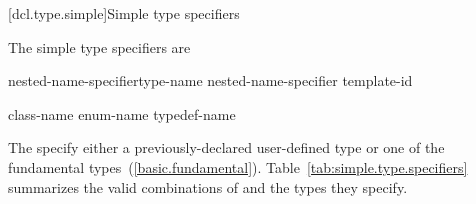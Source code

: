 [dcl.type.simple]{Simple type specifiers}%

\pnum
The simple type specifiers are

\begin{bnf}
\br
    \terminal{::}\opt nested-name-specifier\opt type-name\br
    \terminal{::}\opt nested-name-specifier  template-id\br
    \br
    \br
    \br
    \br
    \br
    \br
    \br
    \br
    \br
    \br
\end{bnf}

\begin{bnf}
\br
    class-name\br
    enum-name\br
    typedef-name
\end{bnf}

%
%
%
%
%
%
%
%
%
%
%
%
The 
specify either a previously-declared user-defined type or one of the
fundamental types~(\ref{basic.fundamental}).
Table~\ref{tab:simple.type.specifiers}
 summarizes the valid combinations of
and the types they specify.

